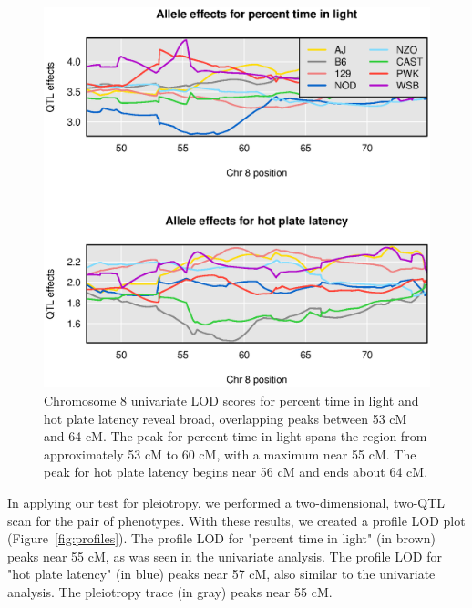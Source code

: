\documentclass[12pt,twoside, lineno]{gsajnl}
\begin{document}
\begin{figure}
\includegraphics[width = \textwidth]{../Rmd/coefs.eps}
\caption{Chromosome 8 univariate LOD scores for percent time in light
  and hot plate latency reveal broad, overlapping peaks between 53 cM
  and 64 cM. The peak for percent time in light spans the region from
  approximately 53 cM to 60 cM, with a maximum near 55 cM. The peak
  for hot plate latency begins near 56 cM and ends about 64 cM.}
\label{fig:chr8-effects}
\end{figure}

In applying our test for pleiotropy,  we performed a two-dimensional, two-QTL scan for the pair of
phenotypes. With these results, we created a profile LOD plot
(Figure~\ref{fig:profiles}). The profile LOD for "percent
time in light" (in brown) peaks near 55 cM, as was seen in the univariate
analysis.  The profile LOD for "hot plate latency" (in blue) peaks near 57 cM,
also similar to the univariate analysis.
The pleiotropy trace (in gray) peaks near 55 cM.
\end{document}
